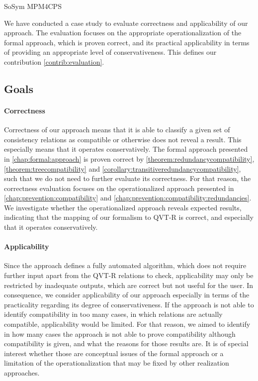 \begin{copiedFrom}{SoSym MPM4CPS}

We have conducted a case study to evaluate correctness and applicability of our approach.
The evaluation focuses on the appropriate operationalization of the formal approach, which is proven correct, and its practical applicability in terms of providing an appropriate level of conservativeness. This defines our contribution \ref{contrib:evaluation}.



\subsection{Goals}

\paragraph{Correctness}
Correctness of our approach means that it is able to classify a given set of consistency relations as compatible or otherwise does not reveal a result.
This especially means that it operates conservatively.
The formal approach presented in \autoref{chap:formal:approach} is proven correct by \autoref{theorem:redundancycompatibility}, \autoref{theorem:treecompatibility} and \autoref{corollary:transitiveredundancycompatibility}, such that we do not need to further evaluate its correctness.
For that reason, the correctness evaluation focuses on the operationalized approach presented in \autoref{chap:prevention:compatibility} and \autoref{chap:prevention:compatibility:redundancies}.
We investigate whether the operationalized approach reveals expected results, indicating that the mapping of our formalism to QVT-R is correct, and especially that it operates conservatively.

\paragraph{Applicability}
Since the approach defines a fully automated algorithm, which does not require further input apart from the QVT-R relations to check, applicability may only be restricted by inadequate outputs, which are correct but not useful for the user.
In consequence, we consider applicability of our approach especially in terms of the practicality regarding its degree of conservativeness.
If the approach is not able to identify compatibility in too many cases, in which relations are actually compatible, applicability would be limited.
For that reason, we aimed to identify in how many cases the approach is not able to prove compatibility although compatibility is given, and what the reasons for those results are.
It is of special interest whether those are conceptual issues of the formal approach or a limitation of the operationalization that may be fixed by other realization approaches.


\end{copiedFrom}
